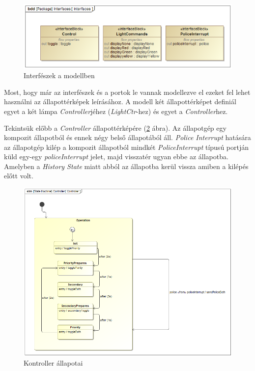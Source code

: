 \begin{figure}[!ht]
	\centering
	\includegraphics[width=15cm, keepaspectratio]{figures/contribution/Interfaces.png}
	\caption{Interfészek a modellben}
	\label{fig:Interfaces}
\end{figure}

Most, hogy már az interfészek és a portok le vannak modellezve el ezeket fel lehet használni az állapottérképek leírásához. A modell két állapottérképet definiál egyet a két lámpa \emph{Controller}jéhez (\emph{LightCtr}-hez) és egyet a \emph{Controller}hez.

Tekintsük előbb a \emph{Controller} állapottérképére (\ref{fig:ControllerSM} ábra). Az állapotgép egy kompozit állapotból és ennek négy belső állapotából áll. \emph{Police Interrupt} hatására az állapotgép kilép a kompozit állapotból mindkét \emph{PoliceInterrupt} típusú portján küld egy-egy \emph{policeInterrupt} jelet, majd visszatér ugyan ebbe az állapotba. Amelyben a \emph{History State} miatt abból az állapotba kerül vissza amiben a kilépés előtt volt.

\begin{figure}[!ht]
	\centering
	\includegraphics[width=12cm, keepaspectratio]{figures/contribution/ControllerSM.png}
	\caption{Kontroller állapotai}
	\label{fig:ControllerSM}
\end{figure}

